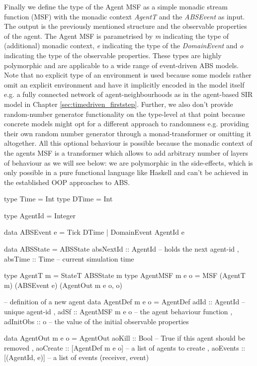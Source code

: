 Finally we define the type of the Agent MSF as a simple monadic stream function (MSF) with the monadic context \textit{AgentT} and the \textit{ABSEvent} as input. The output is the previously mentioned structure and the observable properties of the agent. The Agent MSF is parametrised by \textit{m} indicating the type of (additional) monadic context, \textit{e} indicating the type of the \textit{DomainEvent} and \textit{o} indicating the type of the observable properties. These types are highly polymorphic and are applicable to a wide range of event-driven ABS models. Note that no explicit type of an environment is used because some models rather omit an explicit environment and have it implicitly encoded in the model itself e.g. a fully connected network of agent-neighbourhoods as in the agent-based SIR model in Chapter \ref{sec:timedriven_firststep}. Further, we also don't provide random-number generator functionality on the type-level at that point because concrete models might opt for a different approach to randomness e.g. providing their own random number generator through a monad-transformer or omitting it altogether. All this optional behaviour is possible because the monadic context of the agents MSF is a transformer which allows to add arbitrary number of layers of behaviour as we will see below: we are polymorphic in the side-effects, which is only possible in a pure functional language like Haskell and can't be achieved in the established OOP approaches to ABS.

\begin{HaskellCode}
type Time  = Int
type DTime = Int

type AgentId = Integer

data ABSEvent e = Tick DTime | DomainEvent AgentId e
                
data ABSState = ABSState
  { absNextId :: AgentId -- holds the next agent-id 
  , absTime   :: Time    -- current simulation time
  }

type AgentT m       = StateT ABSState m
type AgentMSF m e o = MSF (AgentT m) (ABSEvent e) (AgentOut m e o, o)

-- definition of a new agent 
data AgentDef m e o = AgentDef
  { adId      :: AgentId         -- unique agent-id
  , adSf      :: AgentMSF m e o  -- the agent behaviour function
  , adInitObs :: o               -- the value of the initial observable properties
  }

data AgentOut m e o = AgentOut 
  { aoKill   :: Bool             -- True if this agent should be removed 
  , aoCreate :: [AgentDef m e o] -- a list of agents to create
  , aoEvents :: [(AgentId, e)]   -- a list of events (receiver, event)
  }
\end{HaskellCode}


